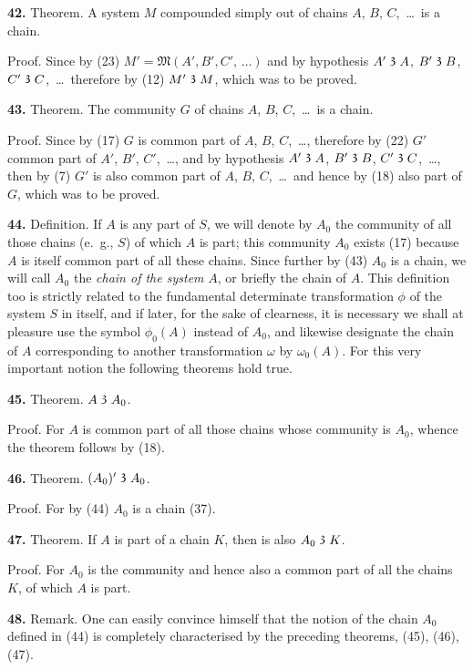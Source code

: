 \documentclass[oneside]{book}
\newcommand\partof{\mathrel{\raisebox{0.45ex}{$\mathfrak{3}$}}}   %
\newcommand\mypara{\medskip\textbf}
\begin{document}
\mypara{42.} Theorem. A system $M$ compounded simply
out of chains $A$, $B$, $C$,~\ldots\ is a chain.

Proof. \label{chain}Since by (23) $M'= \mathfrak{M}(A', B', C',\, \ldots)$ and
by hypothesis $A' \partof A$, %
$B' \partof B$, $C' \partof C$,~\ldots\ therefore by
(12) $M' \partof M$, which was to be proved.

\mypara{43.} Theorem.  The community $G$ of chains $A$,  %
$B$, $C$,~\ldots\ is a chain.

Proof. Since by (17) $G$ is common part of $A$, $B$,
$C$,~\ldots, therefore by (22) $G'$ common part of $A'$, $B'$,
$C'$,~\ldots, and by hypothesis $A' \partof A$, $B' \partof B$, $C' \partof C$,~\ldots,
then by (7) $G'$ is also common part of $A$, $B$, $C$,~\ldots\
and hence by (18) also part of $G$, which was to be
proved.

\mypara{44.} Definition.  If $A$ is any part of $S$, we will denote
by $A_0$ the community of all those chains (e.~g., $S$)
of which $A$ is part; this community $A_0$ exists (17) because
$A$ is itself common part of all these chains.
Since further by (43) $A_0$ is a chain, we will call $A_0$
the \textit{chain of the system} $A$, or briefly the chain of $A$.
This definition too is strictly related to the fundamental
determinate transformation $\phi$ of the system $S$ in
itself, and if later, for the sake of clearness, it is
necessary we shall at pleasure use the symbol $\phi_0(A)$
instead of $A_0$, and likewise designate the chain of $A$
corresponding to another transformation $\omega$ by $\omega_0(A)$.
For this very important notion the following theorems
hold true.

\mypara{45.} Theorem. $A \partof A_0$.

Proof. For $A$ is common part of all those chains
whose community is $A_0$, whence the theorem follows
by (18).

\mypara{46.} Theorem. $(A_0)' \partof A_0$.

Proof. For by (44) $A_0$ is a chain (37).

\mypara{47.} Theorem. If $A$ is part of a chain $K$, then is
also $A_0 \partof K$.

Proof. For $A_0$ is the community and hence also
a common part of all the chains $K$, of which $A$ is
part.

\mypara{48.} Remark. One can easily convince himself that
the notion of the chain $A_0$ defined in (44) is completely
characterised by the preceding theorems, (45),
(46), (47).
\end{document}

